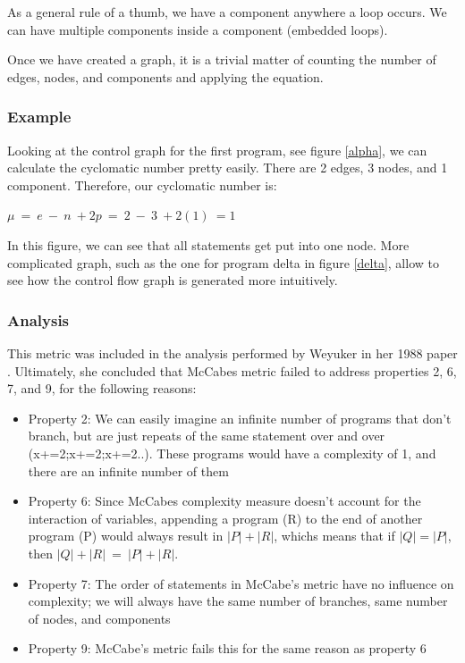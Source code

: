 \documentclass[]{article}
\begin{document}
As a general rule of a thumb, we have a component anywhere a loop occurs.
We can have multiple components inside a component (embedded loops). 

Once we have created a graph, it is a trivial matter of counting the number of edges, nodes, and components and applying the equation.

\subsubsection{Example}

Looking at the control graph for the first program, see figure \ref{alpha}, we can calculate the cyclomatic number pretty easily.
There are 2 edges, 3 nodes, and 1 component.
Therefore, our cyclomatic number is:

$\mu ~= ~e ~- ~n ~+ 2p ~= ~2 ~- ~3 ~+ 2(1) ~= 1$

In this figure, we can see that all statements get put into one node.
More complicated graph, such as the one for program delta in figure \ref{delta}, allow to see how the control flow graph is generated more intuitively.

\subsubsection{Analysis}

This metric was included in the analysis performed by Weyuker in her 1988 paper \cite{ref:evaluating_software_complexity_measures}.
Ultimately, she concluded that McCabes metric failed to address properties 2, 6, 7, and 9, for the following reasons:
\begin{itemize}
	\item Property 2: We can easily imagine an infinite number of programs that don't branch, but are just repeats of the same statement over and over (x+=2;x+=2;x+=2..). These programs would have a complexity of 1, and there are an infinite number of them
	\item Property 6: Since McCabes complexity measure doesn't account for the interaction of variables, appending a program (R) to the end of another program (P) would always result in $|P|+|R|$, whichs means that if $|Q|=|P|$, then $|Q|+|R| ~= ~|P|+|R|$.
	\item Property 7: The order of statements in McCabe's metric have no influence on complexity; we will always have the same number of branches, same number of nodes, and components
	\item Property 9: McCabe's metric fails this for the same reason as property 6
\end{itemize}
\end{document}
